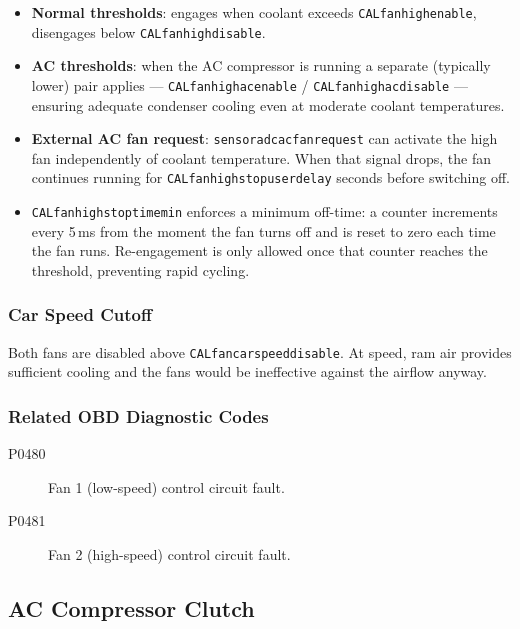 \documentclass[a4paper,11pt]{article}
\renewcommand{\_}{\oldunderscore\allowbreak}
\begin{document}
\begin{itemize}
\item \textbf{Normal thresholds}: engages when coolant exceeds
      \texttt{CAL\_fan\_high\_enable}, disengages below
      \texttt{CAL\_fan\_high\_disable}.
\item \textbf{AC thresholds}: when the AC compressor is running a separate
      (typically lower) pair applies ---
      \texttt{CAL\_fan\_high\_ac\_enable} / \texttt{CAL\_fan\_high\_ac\_disable}
      --- ensuring adequate condenser cooling even at moderate coolant
      temperatures.
\item \textbf{External AC fan request}: \texttt{sensor\_adc\_ac\_fan\_request}
      can activate the high fan independently of coolant temperature. When that
      signal drops, the fan continues running for
      \texttt{CAL\_fan\_high\_stop\_user\_delay} seconds before switching off.
\item \texttt{CAL\_fan\_high\_stop\_time\_min} enforces a minimum off-time: a
      counter increments every 5\,ms from the moment the fan turns off and is
      reset to zero each time the fan runs. Re-engagement is only allowed once
      that counter reaches the threshold, preventing rapid cycling.
\end{itemize}

\subsubsection*{Car Speed Cutoff}

Both fans are disabled above \texttt{CAL\_fan\_car\_speed\_disable}. At speed,
ram air provides sufficient cooling and the fans would be ineffective against
the airflow anyway.

\subsubsection*{Related OBD Diagnostic Codes}

\begin{description}
	\item[P0480] Fan 1 (low-speed) control circuit fault.
	\item[P0481] Fan 2 (high-speed) control circuit fault.
\end{description}

\subsection{AC Compressor Clutch}
\end{document}
